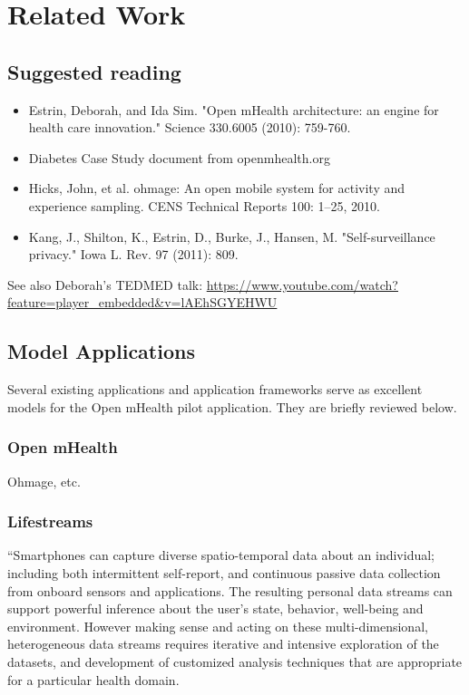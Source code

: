 \section{Related Work}


\subsection{Suggested reading}

\begin{itemize}
\item Estrin, Deborah, and Ida Sim. "Open mHealth architecture: an engine for health care innovation." Science 330.6005 (2010): 759-760.

\item Diabetes Case Study document from openmhealth.org 

\item Hicks, John, et al. ohmage: An open mobile system for activity and experience sampling. CENS Technical Reports 100: 1–25, 2010.

\item Kang, J., Shilton, K., Estrin, D., Burke, J., Hansen, M. "Self-surveillance privacy." Iowa L. Rev. 97 (2011): 809.
\end{itemize} 

See also Deborah's TEDMED talk: 
\url{https://www.youtube.com/watch?feature=player_embedded&v=lAEhSGYEHWU}


\subsection{Model Applications}

Several existing applications and application frameworks serve as excellent models for the Open mHealth pilot application.  They are briefly reviewed below. 

\subsubsection{Open mHealth}
Ohmage, etc.

\subsubsection{Lifestreams}

``Smartphones can capture diverse spatio-temporal data about an individual; including both intermittent self-report, and continuous passive data collection from onboard sensors and applications. The resulting personal data streams can support powerful inference about the user's state, behavior, well-being and environment. However making sense and acting on these multi-dimensional, heterogeneous data streams requires iterative and intensive exploration of the datasets, and development of customized analysis techniques that are appropriate for a particular health domain.

